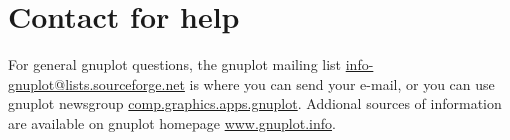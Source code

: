 \section{Contact for help}

For general gnuplot questions, the gnuplot mailing list
\url{info-gnuplot@lists.sourceforge.net} is where you can send your e-mail, or
you can use gnuplot newsgroup \url{comp.graphics.apps.gnuplot}. Addional sources
of information are available on gnuplot homepage \url{www.gnuplot.info}.



